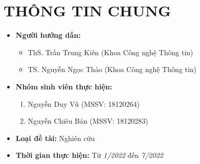 \documentclass{article}[14pt]
\begin{document}
    \vspace{.5cm}
    
    \Large
    \section{THÔNG TIN CHUNG}
    \begin{itemize}[label = {}]
        
        \item \textbf{Người hướng dẫn:} 
        \begin{itemize}
            \item ThS. Trần Trung Kiên (Khoa Công nghệ Thông tin)
            \item TS. Nguyễn Ngọc Thảo (Khoa Công nghệ Thông tin)
        \end{itemize}{}
    
        
        \item \textbf{Nhóm sinh viên thực hiện:}
        
        \begin{enumerate}
        
            \item Nguyễn Duy Vũ (MSSV: 18120264) 
            \item Nguyễn Chiêu Bản (MSSV: 18120283)
        \end{enumerate}

        \item \textbf{Loại đề tài:} Nghiên cứu
        
        \item \textbf{Thời gian thực hiện:} Từ \textit{1/2022} đến \textit{7/2022}
        
        
    \end{itemize}
    
\end{document}
